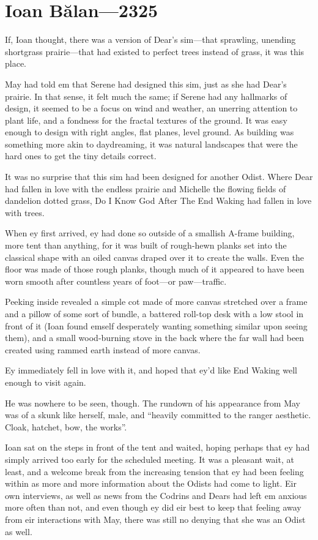\hypertarget{ioan-bux103lan-2325}{%
\chapter{Ioan Bălan---2325}\label{ioan-bux103lan-2325}}

If, Ioan thought, there was a version of Dear's sim---that sprawling, unending shortgrass prairie---that had existed to perfect trees instead of grass, it was this place.

May had told em that Serene had designed this sim, just as she had Dear's prairie. In that sense, it felt much the same; if Serene had any hallmarks of design, it seemed to be a focus on wind and weather, an unerring attention to plant life, and a fondness for the fractal textures of the ground. It was easy enough to design with right angles, flat planes, level ground. As building was something more akin to daydreaming, it was natural landscapes that were the hard ones to get the tiny details correct.

It was no surprise that this sim had been designed for another Odist. Where Dear had fallen in love with the endless prairie and Michelle the flowing fields of dandelion dotted grass, Do I Know God After The End Waking had fallen in love with trees.

When ey first arrived, ey had done so outside of a smallish A-frame building, more tent than anything, for it was built of rough-hewn planks set into the classical shape with an oiled canvas draped over it to create the walls. Even the floor was made of those rough planks, though much of it appeared to have been worn smooth after countless years of foot---or paw---traffic.

Peeking inside revealed a simple cot made of more canvas stretched over a frame and a pillow of some sort of bundle, a battered roll-top desk with a low stool in front of it (Ioan found emself desperately wanting something similar upon seeing them), and a small wood-burning stove in the back where the far wall had been created using rammed earth instead of more canvas.

Ey immediately fell in love with it, and hoped that ey'd like End Waking well enough to visit again.

He was nowhere to be seen, though. The rundown of his appearance from May was of a skunk like herself, male, and ``heavily committed to the ranger aesthetic. Cloak, hatchet, bow, the works''.

Ioan sat on the steps in front of the tent and waited, hoping perhaps that ey had simply arrived too early for the scheduled meeting. It was a pleasant wait, at least, and a welcome break from the increasing tension that ey had been feeling within as more and more information about the Odists had come to light. Eir own interviews, as well as news from the Codrins and Dears had left em anxious more often than not, and even though ey did eir best to keep that feeling away from eir interactions with May, there was still no denying that she was an Odist as well.

